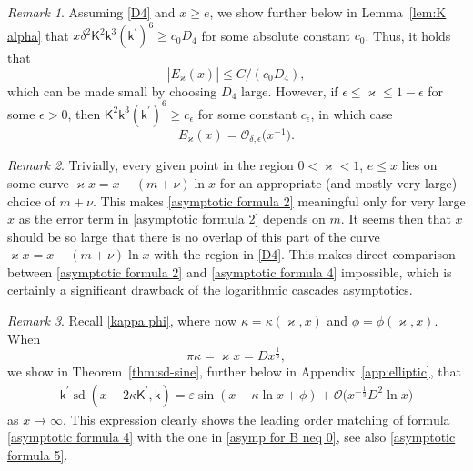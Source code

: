 \documentclass[a4paper,10pt,leqno]{amsart}
\numberwithin{equation}{subsection}
\theoremstyle{plain}
\theoremstyle{definition}
\theoremstyle{remark}
\newtheorem*{rem}{Remark}
\theoremstyle{case}
\newcommand{\kk}{\mathsf{k}}
\newcommand{\KK}{\mathsf{K}}
\DeclareMathOperator{\sd}{sd}
\renewcommand{\O}{\mathcal{O}}
\begin{document}
\begin{tcolorbox}[colback=white,colframe=gray]
\begin{rem}
Assuming \eqref{D4} and \( x\geq e \), we show further below in Lemma~\ref{lem:K alpha} that \( x \delta^2\KK^2\kk^3(\kk^\prime)^6 \geq c_0 D_4 \) for some absolute constant \( c_0 \). Thus, it holds that
\[
|E_\varkappa(x)| \leq C/(c_0 D_4),
\]
which can be made small by choosing \( D_4 \) large. However, if \( \epsilon\leq \varkappa \leq 1-\epsilon \) for some \( \epsilon>0 \), then \( \KK^2\kk^3(\kk^\prime)^6 \geq c_\epsilon \) for some constant \( c_\epsilon \), in which case
\[
E_\varkappa(x) = \O_{\delta,\epsilon}\big(x^{-1}\big).
\]
\end{rem}
\end{tcolorbox}

\begin{tcolorbox}[colback=white,colframe=gray]
\begin{rem}
Trivially, every given point in the region \( 0<\varkappa<1\), \( e\leq x \) lies on some curve \( \varkappa x=x-(m+\nu)\ln x \) for an appropriate (and mostly very large) choice of \( m+\nu\). This makes \eqref{asymptotic formula 2} meaningful only for very large \( x \) as the error term in \eqref{asymptotic formula 2} depends on \( m \). It seems then that \( x \) should be so large that there is no overlap of this part of the curve \( \varkappa x=x-(m+\nu)\ln x \) with the region in \eqref{D4}. This makes direct comparison between \eqref{asymptotic formula 2} and \eqref{asymptotic formula 4} impossible, which is certainly a significant drawback of the logarithmic cascades asymptotics.
\end{rem}
\end{tcolorbox}

\begin{tcolorbox}[colback=white,colframe=gray]
\begin{rem}
Recall \eqref{kappa phi}, where now \( \kappa=\kappa(\varkappa,x) \) and \( \phi=\phi(\varkappa,x) \). When  
\[
\pi\kappa = \varkappa x = D x^{\frac13},
\]
we show in Theorem~\ref{thm:sd-sine}, further below in Appendix~\ref{app:elliptic}, that
\begin{align}
\label{4 to 5 reduction}
\kk^\prime \sd(x - 2\kappa \KK^\prime,\kk) = \varepsilon\sin \left( x - \kappa \ln x + \phi \right) + \O \big( x^{-\frac13} D^2 \ln x\big)
\end{align}
as \( x\to\infty \). This expression clearly shows the leading order matching of formula \eqref{asymptotic formula 4} with the one in \eqref{asymp for B neq 0}, see also \eqref{asymptotic formula 5}.
\end{rem}
\end{tcolorbox}
\end{document}

